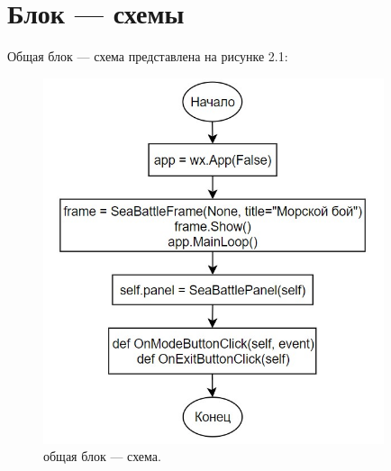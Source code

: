 \section{\label{sec:ch02/sec08}Блок --- схемы}
Общая блок --- схема представлена на рисунке 2.1:
\begin{figure}[H]
\graphicspath{ {img/} }
\centering
\includegraphics[width = 10cm]{общая.jpg}
\caption{общая блок --- схема.}
\end{figure}

